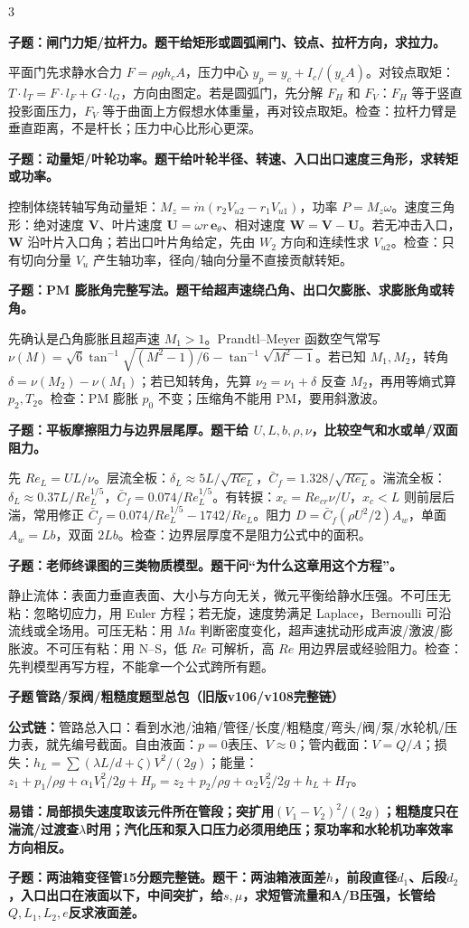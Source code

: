 \documentclass[a4paper]{article}
\newcommand{\qt}[1]{\vspace{0.04pt}\colorbox{Q}{\parbox{\dimexpr\linewidth-2\fboxsep}{\color{white}\bfseries #1}}\par}
\newcommand{\ans}[1]{\colorbox{G}{\parbox{\dimexpr\linewidth-2\fboxsep}{#1}}\par}
\newcommand{\warn}[1]{\colorbox{Y}{\parbox{\dimexpr\linewidth-2\fboxsep}{\color{E}\bfseries #1}}\par}
\newcommand{\form}[1]{{\color{M}\bfseries 公式链：}#1\par}
\newcommand{\labtag}[3]{{\bfseries\color{#1}\colorbox{#1}{\color{white}\fontsize{2.18}{2.28}\selectfont #2}\,#3}\par}
\newcommand{\subt}[1]{\labtag{Q}{子题}{#1}}
\begin{document}
\begin{multicols}{3}
\qt{子题：闸门力矩/拉杆力。题干给矩形或圆弧闸门、铰点、拉杆方向，求拉力。}
\ans{平面门先求静水合力 $F=\rho gh_cA$，压力中心 $y_p=y_c+I_c/(y_cA)$。对铰点取矩：$T\cdot l_T=F\cdot l_F+G\cdot l_G$，方向由图定。若是圆弧门，先分解 $F_H$ 和 $F_V$：$F_H$ 等于竖直投影面压力，$F_V$ 等于曲面上方假想水体重量，再对铰点取矩。检查：拉杆力臂是垂直距离，不是杆长；压力中心比形心更深。}
\qt{子题：动量矩/叶轮功率。题干给叶轮半径、转速、入口出口速度三角形，求转矩或功率。}
\ans{控制体绕转轴写角动量矩：$M_z=\dot m(r_2V_{u2}-r_1V_{u1})$，功率 $P=M_z\omega$。速度三角形：绝对速度 $\bm V$、叶片速度 $\bm U=\omega r\,\bm e_\theta$、相对速度 $\bm W=\bm V-\bm U$。若无冲击入口，$\bm W$ 沿叶片入口角；若出口叶片角给定，先由 $W_2$ 方向和连续性求 $V_{u2}$。检查：只有切向分量 $V_u$ 产生轴功率，径向/轴向分量不直接贡献转矩。}
\qt{子题：PM 膨胀角完整写法。题干给超声速绕凸角、出口欠膨胀、求膨胀角或转角。}
\ans{先确认是凸角膨胀且超声速 $M_1>1$。Prandtl--Meyer 函数空气常写 $\nu(M)=\sqrt6\tan^{-1}\sqrt{(M^2-1)/6}-\tan^{-1}\sqrt{M^2-1}$。若已知 $M_1,M_2$，转角 $\delta=\nu(M_2)-\nu(M_1)$；若已知转角，先算 $\nu_2=\nu_1+\delta$ 反查 $M_2$，再用等熵式算 $p_2,T_2$。检查：PM 膨胀 $p_0$ 不变；压缩角不能用 PM，要用斜激波。}
\qt{子题：平板摩擦阻力与边界层尾厚。题干给 $U,L,b,\rho,\nu$，比较空气和水或单/双面阻力。}
\ans{先 $Re_L=UL/\nu$。层流全板：$\delta_L\approx5L/\sqrt{Re_L}$，$\bar C_f=1.328/\sqrt{Re_L}$。湍流全板：$\delta_L\approx0.37L/Re_L^{1/5}$，$\bar C_f=0.074/Re_L^{1/5}$。有转捩：$x_c=Re_{cr}\nu/U$，$x_c<L$ 则前层后湍，常用修正 $\bar C_f=0.074/Re_L^{1/5}-1742/Re_L$。阻力 $D=\bar C_f(\rho U^2/2)A_w$，单面 $A_w=Lb$，双面 $2Lb$。检查：边界层厚度不是阻力公式中的面积。}
\qt{子题：老师终课图的三类物质模型。题干问“为什么这章用这个方程”。}
\ans{静止流体：表面力垂直表面、大小与方向无关，微元平衡给静水压强。不可压无粘：忽略切应力，用 Euler 方程；若无旋，速度势满足 Laplace，Bernoulli 可沿流线或全场用。可压无粘：用 $Ma$ 判断密度变化，超声速扰动形成声波/激波/膨胀波。不可压有粘：用 N--S，低 $Re$ 可解析，高 $Re$ 用边界层或经验阻力。检查：先判模型再写方程，不能拿一个公式跨所有题。}
\subt{管路/泵阀/粗糙度题型总包（旧版v106/v108完整链）}
\form{管路总入口：看到水池/油箱/管径/长度/粗糙度/弯头/阀/泵/水轮机/压力表，就先编号截面。自由液面：$p=0$表压、$V\approx0$；管内截面：$V=Q/A$；损失：$h_L=\sum(\lambda L/d+\zeta)V^2/(2g)$；能量：$z_1+p_1/\rho g+\alpha_1V_1^2/2g+H_p=z_2+p_2/\rho g+\alpha_2V_2^2/2g+h_L+H_T$。}
\warn{易错：局部损失速度取该元件所在管段；突扩用$(V_1-V_2)^2/(2g)$；粗糙度只在湍流/过渡查$\lambda$时用；汽化压和泵入口压力必须用绝压；泵功率和水轮机功率效率方向相反。}
\qt{子题：两油箱变径管15分题完整链。题干：两油箱液面差$h$，前段直径$d_1$、后段$d_2$，入口出口在液面以下，中间突扩，给$s,\mu$，求短管流量和A/B压强，长管给$Q,L_1,L_2,e$反求液面差。}

\end{multicols}
\end{document}
